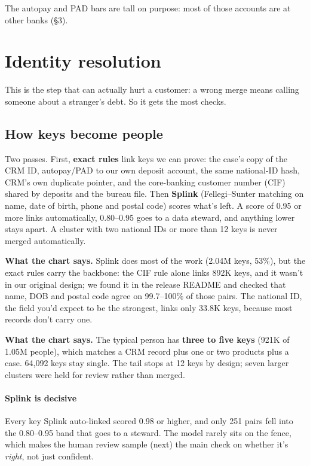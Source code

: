\documentclass[11pt]{article}
\begin{document}
The autopay and PAD bars are tall on purpose: most of those accounts are at other banks (§3).

\section{Identity resolution}

This is the step that can actually hurt a customer: a wrong merge means calling someone about a stranger's debt. So it
gets the most checks.

\subsection{How keys become people}

Two passes. First, \textbf{exact rules} link keys we can prove: the case's copy of the CRM ID, autopay/PAD to our own
deposit account, the same national-ID hash, CRM's own duplicate pointer, and the core-banking customer number (CIF)
shared by deposits and the bureau file. Then \textbf{Splink} (Fellegi–Sunter matching on name, date of birth, phone and
postal code) scores what's left. A score of 0.95 or more links automatically, 0.80–0.95 goes to a data steward, and
anything lower stays apart. A cluster with two national IDs or more than 12 keys is never merged automatically.


\textbf{What the chart says.} Splink does most of the work (2.04M keys, 53\%), but the exact rules carry the backbone:
the CIF rule alone links 892K keys, and it wasn't in our original design; we found it in the release README and checked
that name, DOB and postal code agree on 99.7–100\% of those pairs. The national ID, the field you'd expect to be the
strongest, links only 33.8K keys, because most records don't carry one.


\textbf{What the chart says.} The typical person has \textbf{three to five keys} (921K of 1.05M people), which matches a
CRM record plus one or two products plus a case. 64,092 keys stay single. The tail stops at 12 keys by design; seven
larger clusters were held for review rather than merged.

\paragraph{Splink is decisive} Every key Splink auto-linked scored 0.98 or higher, and only 251 pairs fell into the
0.80–0.95 band that goes to a steward. The model rarely sits on the fence, which makes the human review sample (next)
the main check on whether it's \emph{right}, not just confident.
\end{document}
